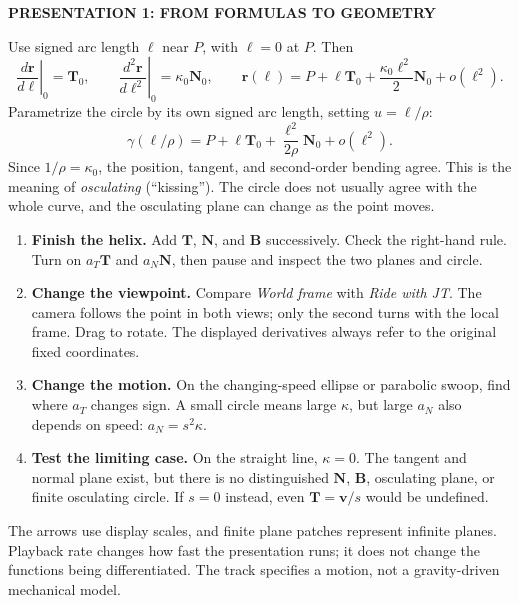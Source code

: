 \documentclass[11pt,letterpaper]{article}
\newcommand{\R}{\mathbf r}\newcommand{\V}{\mathbf v}\newcommand{\A}{\mathbf a}
\newcommand{\T}{\mathbf T}\newcommand{\N}{\mathbf N}\newcommand{\B}{\mathbf B}
\newcommand{\heading}[1]{\vspace{3pt}{\large\bfseries #1}\par}
\newcommand{\tagline}[1]{{\small\bfseries\color{inkblue}#1}\par}
\begin{document}
\newpage
\tagline{PRESENTATION 1: FROM FORMULAS TO GEOMETRY}
\heading{Why is this the circle that fits the curve?}
Use signed arc length $\ell$ near $P$, with $\ell=0$ at $P$. Then
\[
 \left.\frac{d\R}{d\ell}\right|_0=\T_0,\qquad
 \left.\frac{d^2\R}{d\ell^2}\right|_0=\kappa_0\N_0,
 \qquad
 \R(\ell)=P+\ell\T_0+\frac{\kappa_0\ell^2}{2}\N_0+o(\ell^2).
\]
Parametrize the circle by its own signed arc length, setting $u=\ell/\rho$:
\[
 \gamma(\ell/\rho)
 =P+\ell\T_0+\frac{\ell^2}{2\rho}\N_0+o(\ell^2).
\]
Since $1/\rho=\kappa_0$, the position, tangent, and second-order bending agree. This is the meaning of \emph{osculating} (``kissing''). The circle does not usually agree with the whole curve, and the osculating plane can change as the point moves.

\begin{center}
\end{center}

\heading{Explore with the rollercoaster cart}
\begin{enumerate}
 \item \textbf{Finish the helix.} Add $\T$, $\N$, and $\B$ successively. Check the right-hand rule. Turn on $a_T\T$ and $a_N\N$, then pause and inspect the two planes and circle.
 \item \textbf{Change the viewpoint.} Compare \emph{World frame} with \emph{Ride with JT}. The camera follows the point in both views; only the second turns with the local frame. Drag to rotate. The displayed derivatives always refer to the original fixed coordinates.
 \item \textbf{Change the motion.} On the changing-speed ellipse or parabolic swoop, find where $a_T$ changes sign. A small circle means large $\kappa$, but large $a_N$ also depends on speed: $a_N=s^2\kappa$.
 \item \textbf{Test the limiting case.} On the straight line, $\kappa=0$. The tangent and normal plane exist, but there is no distinguished $\N$, $\B$, osculating plane, or finite osculating circle. If $s=0$ instead, even $\T=\V/s$ would be undefined.
\end{enumerate}
The arrows use display scales, and finite plane patches represent infinite planes. Playback rate changes how fast the presentation runs; it does not change the functions being differentiated. The track specifies a motion, not a gravity-driven mechanical model.
\end{document}

